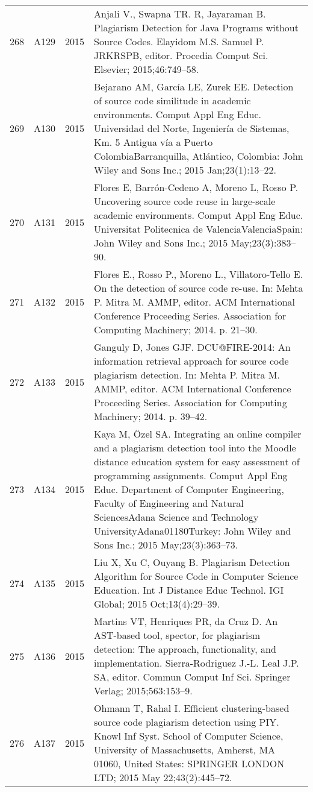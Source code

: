 \documentclass{article}\usepackage[]{graphicx}\usepackage[]{color}
\begin{document}
\begin{longtable}{l|L{1cm}|L{1cm}|L{12cm}|}
  268 & A129 & 2015 & Anjali V., Swapna TR. R, Jayaraman B. Plagiarism Detection for Java Programs without Source Codes. Elayidom M.S. Samuel P. JRKRSPB, editor. Procedia Comput Sci. Elsevier; 2015;46:749–58. \\ 
  269 & A130 & 2015 & Bejarano AM, García LE, Zurek EE. Detection of source code similitude in academic environments. Comput Appl Eng Educ. Universidad del Norte, Ingeniería de Sistemas, Km. 5 Antigua vía a Puerto ColombiaBarranquilla, Atlántico, Colombia: John Wiley and Sons Inc.; 2015 Jan;23(1):13–22. \\ 
  270 & A131 & 2015 & Flores E, Barrón-Cedeno A, Moreno L, Rosso P. Uncovering source code reuse in large-scale academic environments. Comput Appl Eng Educ. Universitat Politecnica de ValenciaValenciaSpain: John Wiley and Sons Inc.; 2015 May;23(3):383–90. \\ 
  271 & A132 & 2015 & Flores E., Rosso P., Moreno L., Villatoro-Tello E. On the detection of source code re-use. In: Mehta P. Mitra M. AMMP, editor. ACM International Conference Proceeding Series. Association for Computing Machinery; 2014. p. 21–30. \\ 
  272 & A133 & 2015 & Ganguly D, Jones GJF. DCU@FIRE-2014: An information retrieval approach for source code plagiarism detection. In: Mehta P. Mitra M. AMMP, editor. ACM International Conference Proceeding Series. Association for Computing Machinery; 2014. p. 39–42. \\ 
  273 & A134 & 2015 & Kaya M, Özel SA. Integrating an online compiler and a plagiarism detection tool into the Moodle distance education system for easy assessment of programming assignments. Comput Appl Eng Educ. Department of Computer Engineering, Faculty of Engineering and Natural SciencesAdana Science and Technology UniversityAdana01180Turkey: John Wiley and Sons Inc.; 2015 May;23(3):363–73. \\ 
  274 & A135 & 2015 & Liu X, Xu C, Ouyang B. Plagiarism Detection Algorithm for Source Code in Computer Science Education. Int J Distance Educ Technol. IGI Global; 2015 Oct;13(4):29–39. \\ 
  275 & A136 & 2015 & Martins VT, Henriques PR, da Cruz D. An AST-based tool, spector, for plagiarism detection: The approach, functionality, and implementation. Sierra-Rodriguez J.-L. Leal J.P. SA, editor. Commun Comput Inf Sci. Springer Verlag; 2015;563:153–9. \\ 
  276 & A137 & 2015 & Ohmann T, Rahal I. Efficient clustering-based source code plagiarism detection using PIY. Knowl Inf Syst. School of Computer Science, University of Massachusetts, Amherst, MA 01060, United States: SPRINGER LONDON LTD; 2015 May 22;43(2):445–72. \\ 

\end{longtable}
\end{document}
